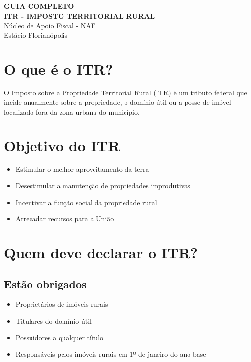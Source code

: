 \documentclass[12pt,a4paper]{article}
\begin{document}
\begin{center}
{\LARGE \textbf{GUIA COMPLETO}}\\[0.5cm]
{\Large \textbf{ITR - IMPOSTO TERRITORIAL RURAL}}\\[0.5cm]
{\large Núcleo de Apoio Fiscal - NAF}\\
{\large Estácio Florianópolis}\\[1cm]
\end{center}

\section{O que é o ITR?}

O Imposto sobre a Propriedade Territorial Rural (ITR) é um tributo federal que incide anualmente sobre a propriedade, o domínio útil ou a posse de imóvel localizado fora da zona urbana do município.

\section{Objetivo do ITR}

\begin{itemize}
    \item Estimular o melhor aproveitamento da terra
    \item Desestimular a manutenção de propriedades improdutivas
    \item Incentivar a função social da propriedade rural
    \item Arrecadar recursos para a União
\end{itemize}

\section{Quem deve declarar o ITR?}

\subsection{Estão obrigados}
\begin{itemize}
    \item Proprietários de imóveis rurais
    \item Titulares do domínio útil
    \item Possuidores a qualquer título
    \item Responsáveis pelos imóveis rurais em 1º de janeiro do ano-base
\end{itemize}
\end{document}
